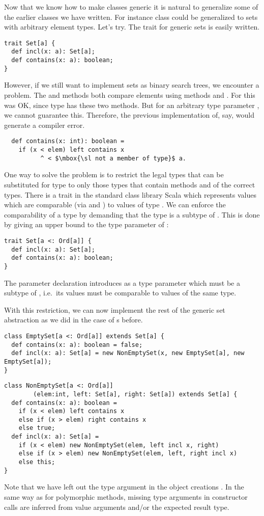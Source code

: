 Now that we know how to make classes generic it is natural to
generalize some of the earlier classes we have written. For instance
class  could be generalized to sets with arbitrary
element types. Let's try. The trait for generic sets is easily
written.
\begin{lstlisting}
trait Set[a] { 
  def incl(x: a): Set[a]; 
  def contains(x: a): boolean; 
}
\end{lstlisting}
However, if we still want to implement sets as binary search trees, we
encounter a problem. The  and  methods both
compare elements using methods \code{<} and \code{>}. For
 this was OK, since type  has these two
methods. But for an arbitrary type parameter , we cannot
guarantee this. Therefore, the previous implementation of, say,
 would generate a compiler error.
\begin{lstlisting}
  def contains(x: int): boolean = 
    if (x < elem) left contains x
          ^ < $\mbox{\sl not a member of type}$ a.
\end{lstlisting}
One way to solve the problem is to restrict the legal types that can
be substituted for type  to only those types that contain methods
\code{<} and \code{>} of the correct types. There is a trait
 in the standard class library Scala which represents
values which are comparable (via \code{<} and \code{>}) to values of
type . We can enforce the comparability of a type by demanding
that the type is a subtype of . This is done by giving an
upper bound to the type parameter of :
\begin{lstlisting}
trait Set[a <: Ord[a]] { 
  def incl(x: a): Set[a]; 
  def contains(x: a): boolean; 
}
\end{lstlisting}
The parameter declaration  introduces  as a
type parameter which must be a subtype of , i.e.\ its values
must be comparable to values of the same type.

With this restriction, we can now implement the rest of the generic
set abstraction as we did in the case of s before.

\begin{lstlisting}
class EmptySet[a <: Ord[a]] extends Set[a] {
  def contains(x: a): boolean = false;
  def incl(x: a): Set[a] = new NonEmptySet(x, new EmptySet[a], new EmptySet[a]);
}
\end{lstlisting}

\begin{lstlisting}
class NonEmptySet[a <: Ord[a]]
        (elem:int, left: Set[a], right: Set[a]) extends Set[a] {
  def contains(x: a): boolean = 
    if (x < elem) left contains x
    else if (x > elem) right contains x
    else true;
  def incl(x: a): Set[a] = 
    if (x < elem) new NonEmptySet(elem, left incl x, right)
    else if (x > elem) new NonEmptySet(elem, left, right incl x)
    else this;
}
\end{lstlisting}
Note that we have left out the type argument in the object creations
. In the same way as for polymorphic methods,
missing type arguments in constructor calls are inferred from value
arguments and/or the expected result type.

